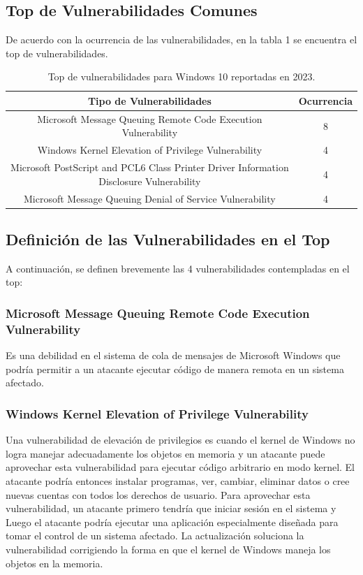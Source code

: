 \documentclass[stu, 11pt, letterpaper, donotrepeattitle, floatsintext, natbib]{apa7}
\begin{document}
\subsection{Top de Vulnerabilidades Comunes} 

De acuerdo con la ocurrencia de las vulnerabilidades, en la tabla 1 se encuentra el top de vulnerabilidades.

\begin{table}[H]
    \caption{Top de vulnerabilidades para Windows 10 reportadas en 2023.}
    \centering
    \begin{tabular}{cc} %
        \hline 
         Tipo de Vulnerabilidades & Ocurrencia\\
         \hline
         Microsoft Message Queuing Remote Code Execution Vulnerability & 8\\
          Windows Kernel Elevation of Privilege Vulnerability & 4\\
	Microsoft PostScript and PCL6 Class Printer Driver Information Disclosure Vulnerability & 4\\
	Microsoft Message Queuing Denial of Service Vulnerability & 4\\
         \hline
    \end{tabular}
    \label{tab:table_words}
\end{table}

\subsection{Definición de las Vulnerabilidades en el Top} 

A continuación, se definen brevemente las 4 vulnerabilidades contempladas en el top:

\subsubsection{Microsoft Message Queuing Remote Code Execution Vulnerability}

Es una debilidad en el sistema de cola de mensajes de Microsoft Windows que podría permitir a un atacante ejecutar código de manera remota en un sistema afectado.

\subsubsection{Windows Kernel Elevation of Privilege Vulnerability}

Una vulnerabilidad de elevación de privilegios es cuando el kernel de Windows no logra manejar adecuadamente los objetos en memoria y un atacante puede aprovechar esta vulnerabilidad para ejecutar código arbitrario en modo kernel. El atacante podría entonces instalar programas, ver, cambiar, eliminar datos o cree nuevas cuentas con todos los derechos de usuario. Para aprovechar esta vulnerabilidad, un atacante primero tendría que iniciar sesión en el sistema y Luego el atacante podría ejecutar una aplicación especialmente diseñada para tomar el control de un sistema afectado. La actualización soluciona la vulnerabilidad corrigiendo la forma en que el kernel de Windows maneja los objetos en la memoria.
\end{document}
